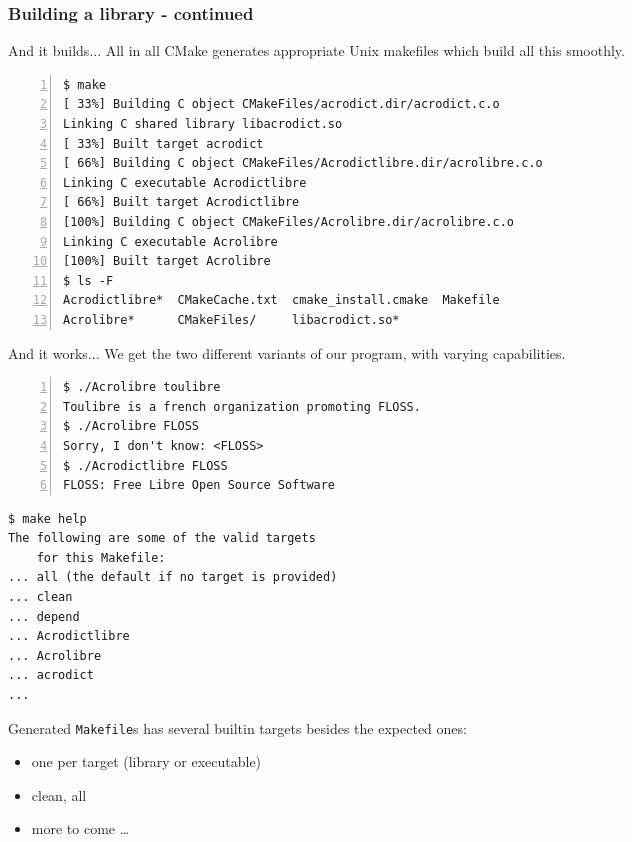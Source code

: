 \documentclass[compress,slidestop,table
              ]
               {beamer}
\newcommand{\fname}[1]{\texttt{#1}}
\begin{document}
\begin{frame}
\frametitle{Building a library - continued}

\begin{block}{And it builds...}
All in all CMake generates appropriate Unix makefiles which build
all this smoothly.
\end{block}
\begin{Verbatim}[fontsize=\tiny,numbers=left,frame=topline,label=CMake + Unix Makefile]
$ make
[ 33%] Building C object CMakeFiles/acrodict.dir/acrodict.c.o
Linking C shared library libacrodict.so
[ 33%] Built target acrodict
[ 66%] Building C object CMakeFiles/Acrodictlibre.dir/acrolibre.c.o
Linking C executable Acrodictlibre
[ 66%] Built target Acrodictlibre
[100%] Building C object CMakeFiles/Acrolibre.dir/acrolibre.c.o
Linking C executable Acrolibre
[100%] Built target Acrolibre
$ ls -F
Acrodictlibre*  CMakeCache.txt  cmake_install.cmake  Makefile
Acrolibre*      CMakeFiles/     libacrodict.so*
\end{Verbatim}

\begin{block}{And it works...}
We get the two different variants of our program, with varying capabilities.
\end{block}
\begin{multicols}{2}
\begin{Verbatim}[fontsize=\tiny,numbers=left]
$ ./Acrolibre toulibre
Toulibre is a french organization promoting FLOSS.
$ ./Acrolibre FLOSS
Sorry, I don't know: <FLOSS>
$ ./Acrodictlibre FLOSS
FLOSS: Free Libre Open Source Software
\end{Verbatim}
\begin{Verbatim}[fontsize=\tiny,]
$ make help
The following are some of the valid targets
    for this Makefile:
... all (the default if no target is provided)
... clean
... depend
... Acrodictlibre
... Acrolibre
... acrodict
...
\end{Verbatim}
Generated \fname{Makefile}s has several builtin targets besides the
expected ones:
\begin{itemize}
\item one per target (library or executable)
\item clean, all
\item more to come \ldots
\end{itemize}
\end{multicols}
\end{frame}
\end{document}
